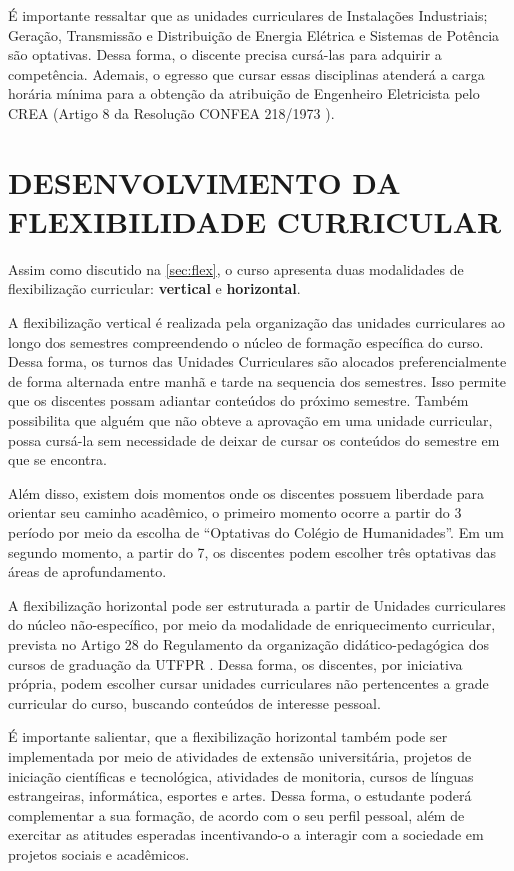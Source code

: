 É importante ressaltar que as unidades curriculares de Instalações Industriais; Geração, Transmissão e Distribuição de Energia Elétrica e Sistemas de Potência são optativas. Dessa forma, o discente precisa cursá-las para adquirir a competência. Ademais, o egresso que cursar essas disciplinas atenderá a carga horária mínima para a obtenção da atribuição de Engenheiro Eletricista pelo CREA (Artigo 8\textordmasculine{} da Resolução CONFEA 218/1973 \cite{confea1973}).

\section{DESENVOLVIMENTO DA FLEXIBILIDADE CURRICULAR}

Assim como discutido na \autoref{sec:flex}, o curso apresenta duas modalidades de flexibilização curricular: \textbf{vertical} e \textbf{horizontal}. 

A flexibilização vertical é realizada pela organização das unidades curriculares ao longo dos semestres compreendendo o núcleo de formação específica do curso. Dessa forma, os turnos das Unidades Curriculares são alocados preferencialmente de forma alternada entre manhã e tarde na sequencia dos semestres. Isso permite que os discentes possam adiantar conteúdos do próximo semestre. Também possibilita que alguém que não obteve a aprovação em uma unidade curricular, possa cursá-la sem necessidade de deixar de cursar os conteúdos do semestre em que se encontra.

Além disso, existem dois momentos onde os discentes possuem liberdade para orientar seu caminho acadêmico, o primeiro momento ocorre a partir do 3\textordmasculine{} período por meio da escolha de ``Optativas do Colégio de Humanidades''. Em um segundo momento, a partir do 7\textordmasculine{}, os discentes podem escolher três optativas das áreas de aprofundamento.

A flexibilização horizontal pode ser estruturada a partir de Unidades curriculares do núcleo não-específico, por meio da modalidade de enriquecimento curricular, prevista no Artigo 28 do Regulamento da organização didático-pedagógica dos cursos de graduação da UTFPR \cite{rodp}. Dessa forma, os discentes, por iniciativa própria, podem escolher cursar unidades curriculares não pertencentes a grade curricular do curso, buscando conteúdos de interesse pessoal.

É importante salientar, que a flexibilização horizontal também pode ser implementada por meio de atividades de extensão universitária, projetos de iniciação científicas e tecnológica, atividades de monitoria, cursos de línguas estrangeiras, informática, esportes e artes. Dessa forma, o estudante poderá complementar a sua formação, de acordo com o seu perfil pessoal, além de exercitar as atitudes esperadas incentivando-o a interagir com a sociedade em projetos sociais e acadêmicos.

